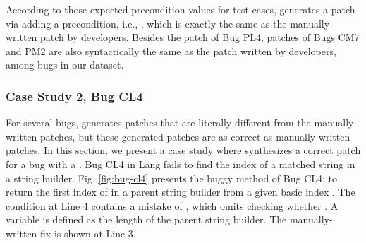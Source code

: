 \begin{table}[!t]
\centering
\caption{Sample of test cases for Bug PL4}
\label{tab:test-pl4}

\end{table}

According to those expected precondition values for test cases, \nopol generates a patch via adding a precondition, i.e., , which is exactly the same as the manually-written patch by developers. Besides the patch of Bug PL4, patches of Bugs CM7 and PM2 are also syntactically the same as the patch written by developers, among \numbug bugs in our dataset.

\subsubsection{Case Study 2, Bug CL4}
\label{subsubsect:bug-cl4}

For several bugs, \nopol generates patches that are literally different from the manually-written patches, but these generated patches are as correct as manually-written patches. In this section, we present a case study where \nopol synthesizes a correct patch for a bug with a \buggycondition. 
Bug CL4 in Lang fails to find the index of a matched string in a string builder. Fig. \ref{fig:bug-cl4} presents the buggy method of Bug CL4: to return the first index of  in a parent string builder from a given basic index . The condition at Line 4 contains a mistake of , which omits checking whether . A variable  is defined as the length of the parent string builder. The manually-written fix is shown at Line 3. 

